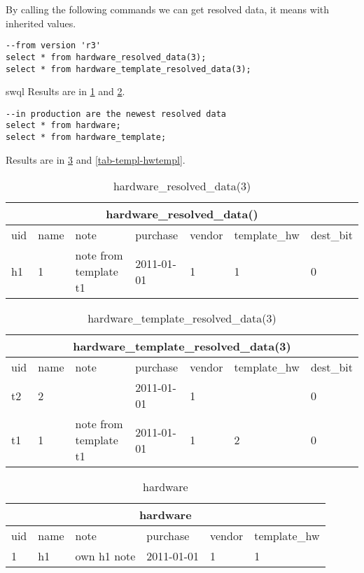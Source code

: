 \documentclass[deska]{subfiles}
\begin{document}
By calling the following commands we can get resolved data, it means with inherited values.
\begin{verbatim}
--from version 'r3'
select * from hardware_resolved_data(3);
select * from hardware_template_resolved_data(3);
\end{verbatim}{swql}
Results are in \ref{tab-templ-hwres2} and \ref{tab-templ-hwtemplres2}.

\begin{verbatim}
--in production are the newest resolved data
select * from hardware;
select * from hardware_template;
\end{verbatim}
Results are in \ref{tab-templ-hw} and \ref{tab-templ-hwtempl}.

\begin{center}

\begin{table}
    \caption{hardware\_resolved\_data(3)}
    \label{tab-templ-hwres2}
\begin{tabular}{ | l | l | l | l | l | l | l |}
    \hline
    \multicolumn{7}{|c|}{hardware\_resolved\_data()}\\
    \hline
    uid & name & note & purchase & vendor & template\_hw & dest\_bit\\
    \hline
    h1 & 1 & note from template t1 & 2011-01-01 & 1 & 1 & 0\\
    \hline
\end{tabular}
\end{table}

\begin{table}
    \caption{hardware\_template\_resolved\_data(3)}
    \label{tab-templ-hwtemplres2}
\begin{tabular}{ | l | l | l | l | l | l | l |}
    \hline
    \multicolumn{7}{|c|}{hardware\_template\_resolved\_data(3)}\\
    \hline
    uid & name & note & purchase & vendor & template\_hw & dest\_bit\\
    \hline
    t2 & 2 &  & 2011-01-01 & 1 &  & 0\\
    t1 & 1 & note from template t1 & 2011-01-01 & 1 & 2 & 0\\
    \hline
\end{tabular}
\end{table}

\begin{table}
    \caption{hardware}
    \label{tab-templ-hw}
\begin{tabular}{ | l | l | l | l | l | l |}
    \hline
    \multicolumn{6}{|c|}{hardware}\\
    \hline
    uid & name & note & purchase & vendor & template\_hw\\
    \hline
    1 & h1 & own h1 note & 2011-01-01 & 1 & 1\\
    \hline
\end{tabular}
\end{table}


\end{center}
\end{document}

